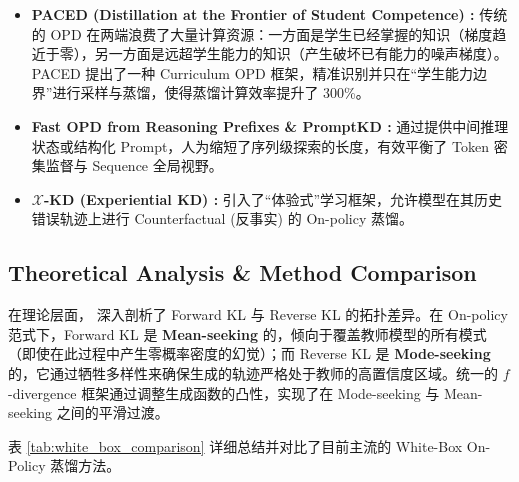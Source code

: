 \begin{itemize}
    \item \textbf{PACED (Distillation at the Frontier of Student Competence) \cite{paced2026}:} 传统的 OPD 在两端浪费了大量计算资源：一方面是学生已经掌握的知识（梯度趋近于零），另一方面是远超学生能力的知识（产生破坏已有能力的噪声梯度）。PACED 提出了一种 Curriculum OPD 框架，精准识别并只在“学生能力边界”进行采样与蒸馏，使得蒸馏计算效率提升了 300\%。
    \item \textbf{Fast OPD from Reasoning Prefixes \cite{fastopd2026} \& PromptKD \cite{promptkd2024}:} 通过提供中间推理状态或结构化 Prompt，人为缩短了序列级探索的长度，有效平衡了 Token 密集监督与 Sequence 全局视野。
    \item \textbf{$\mathcal{X}$-KD (Experiential KD) \cite{xkd2026}:} 引入了“体验式”学习框架，允许模型在其历史错误轨迹上进行 Counterfactual (反事实) 的 On-policy 蒸馏。
\end{itemize}

\subsection{Theoretical Analysis \& Method Comparison}
\label{subsec:theory_whitebox}

在理论层面，\cite{rethinkingkl2024} 深入剖析了 Forward KL 与 Reverse KL 的拓扑差异。在 On-policy 范式下，Forward KL 是 \textbf{Mean-seeking} 的，倾向于覆盖教师模型的所有模式（即使在此过程中产生零概率密度的幻觉）；而 Reverse KL 是 \textbf{Mode-seeking} 的，它通过牺牲多样性来确保生成的轨迹严格处于教师的高置信度区域。统一的 $f$-divergence 框架通过调整生成函数的凸性，实现了在 Mode-seeking 与 Mean-seeking 之间的平滑过渡。

表 \ref{tab:white_box_comparison} 详细总结并对比了目前主流的 White-Box On-Policy 蒸馏方法。

